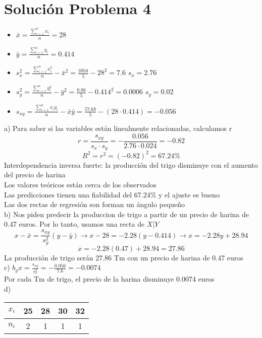 \documentclass[fleqn]{article}
\begin{document}
	\section{Solución Problema 4}
	\begin{itemize}
		\item $\bar{x} = \frac{\sum_{i=1}^n x_i}{n} = 28$
		\item $\bar{y} = \frac{\sum_{i=1}^n y_i}{n} = 0.414$ 
		\item $s_x^{2} = \frac{\sum_{i=1}^n x_i^{2}}{n} - \bar{x}^{2} = \frac{3958}{5} - 28^{2} = 7.6$ $s_x = 2.76$
		\item $s_y^{2} = \frac{\sum_{i=1}^n y_i^{2}}{n} - \bar{y}^{2} = \frac{0.86}{5} - 0.414^{2} = 0.0006$ $s_y = 0.02$
		\item $s_{xy} = \frac{\sum_{i=1}^n x_i y_i}{n} - \bar{x} \bar{y} = \frac{57.68}{5} - (28 \cdot 0.414) = -0.056$
	\end{itemize}
	a) Para saber si las variables están linealmente relacionadas, calculamos r
	\[
	r = \frac{s_{xy}}{s_x \cdot s_y} = -\frac{0.056}{2.76 \cdot 0.024} = \boxed{-0.82}
	\]
	\[
	R^2 = r^2 = (-0.82)^{2} = \boxed{67.24\%}
	\]
	Interdependencia inversa fuerte: la producción del trigo disminuye con el aumento del precio de harina \\
	Los valores teóricos están cerca de los observados \\
	Las predicciones tienen una fiabilidad del 67.24\% y el ajuste es bueno \\
	Las dos rectas de regresión son forman un ángulo pequeño \\
	b)  Nos piden predecir la produccion de trigo a partir de un precio de harina de 0.47 euros. Por lo tanto, usamos una recta de $X | Y$
	\[
	x - \bar{x} = \frac{s_{xy}}{s_y^{2}} (y - \bar{y}) \rightarrow x - 28 = -2.28(y - 0.414) \rightarrow x = -2.28y + 28.94
	\]
	\[
	x = -2.28(0.47) + 28.94 = 27.86
	\]
	La producción de trigo serán 27.86 Tm con un precio de harina de 0.47 euros \\
	c) $b_yx = \frac{s_{xy}}{s_x^2} = -\frac{0.056}{7.6} = -0.0074$ \\
	Por cada Tm de trigo, el precio de la harina disminuye 0.0074 euros \\
	d) \\
	\begin{table}[h!]
		\centering
		\begin{tabular}{|c|c|c|c|c|}
			\hline
			\( x_i \) & 25 & 28 & 30 & 32 \\ \hline
			\( n_i \) & 2 & 1 & 1 & 1 \\ \hline
		\end{tabular}
	\end{table}
	
\end{document}
